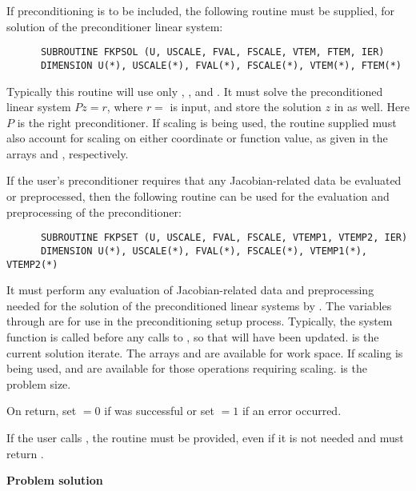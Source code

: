 \begin{Steps}
  If preconditioning is to be included, the following routine must be
  supplied, for solution of the preconditioner linear system:
\begin{verbatim}
      SUBROUTINE FKPSOL (U, USCALE, FVAL, FSCALE, VTEM, FTEM, IER)
      DIMENSION U(*), USCALE(*), FVAL(*), FSCALE(*), VTEM(*), FTEM(*)
\end{verbatim}
  Typically this routine will use only , ,  and .
  It must solve the preconditioned linear system $Pz = r$, where
  $r = $  is input, and store the solution $z$ in  as well. 
  Here $P$ is the right preconditioner. If scaling is being used, the
  routine supplied must also account for scaling on either coordinate
  or function value, as given in the arrays  and
  , respectively.
  
  If the user's preconditioner requires that any Jacobian-related data be evaluated
  or preprocessed, then the following routine can be used for the evaluation and
  preprocessing of the preconditioner:
\begin{verbatim}
      SUBROUTINE FKPSET (U, USCALE, FVAL, FSCALE, VTEMP1, VTEMP2, IER)
      DIMENSION U(*), USCALE(*), FVAL(*), FSCALE(*), VTEMP1(*), VTEMP2(*)
\end{verbatim}
  It must perform any evaluation of Jacobian-related data and
  preprocessing needed for the solution of the preconditioned linear
  systems by . The variables  through  are for use in the
  preconditioning setup process. Typically, the system function  is
  called before any calls to , so that  will have
  been updated.  is the current solution
  iterate. The arrays  and  are available for work space. 
  If scaling is being used,  and  are available for those operations
  requiring scaling.  is the problem size.
  
  On return, set  $= 0$ if  was successful or set  $= 1$
  if an error occurred.
  
  {\warn} If the user calls , the routine  must
  be provided, even if it is not needed and must return .

\item {\bf Problem solution}


\end{Steps}
